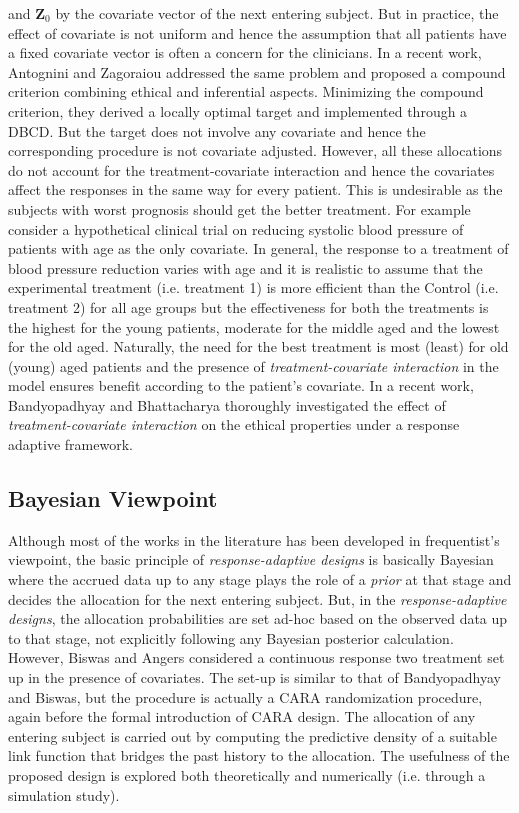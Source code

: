 and ${\mathbf{Z}}_{0}$ by the covariate vector of the next entering subject. But in practice, the effect of covariate is not uniform and hence  the assumption that all patients have a fixed covariate vector is often a concern for the clinicians. In a recent work, Antognini and Zagoraiou\cite{65} addressed the same problem and proposed a compound criterion combining ethical and inferential aspects. Minimizing the compound criterion, they derived a locally optimal target and implemented through a DBCD. But the target does not involve any covariate  and hence the corresponding procedure is not covariate adjusted.  However, all these allocations do not account for the treatment-covariate interaction\cite{66} and hence the covariates affect the responses in the same way for every patient. This is undesirable as the subjects with worst prognosis should get the better treatment. For example consider a hypothetical clinical trial on reducing systolic blood pressure of patients with age  as the only covariate. In general,  the response to a treatment of blood pressure reduction varies with age and it is realistic to assume that the experimental treatment (i.e. treatment 1) is more efficient than the Control (i.e. treatment 2) for all age groups but the effectiveness for both the treatments is the highest for the young patients, moderate for the middle aged and the lowest for the old aged. Naturally, the need for the best treatment is most (least) for  old (young) aged patients and the presence of \textit{treatment-covariate interaction} in the model ensures  benefit according to the patient's covariate. In a recent work, Bandyopadhyay and Bhattacharya\cite{67} thoroughly investigated the effect of \textit{treatment-covariate interaction} on the ethical properties under a response adaptive framework.

\subsection{Bayesian Viewpoint}

Although most of the works in the literature has been developed in frequentist's viewpoint, the basic principle of \textit{response-adaptive designs} is basically Bayesian where the accrued data up to any stage plays the
role of a \textit{prior} at that stage and decides the allocation for the next
entering subject. But, in the \textit{response-adaptive designs}, the allocation probabilities are set ad-hoc based on the observed data up to that stage, not explicitly following any Bayesian posterior calculation. However, Biswas and Angers\cite{68} considered a continuous response two treatment set up in the presence of covariates. The set-up is similar to that of Bandyopadhyay and Biswas\cite{60}, but the procedure is actually a CARA randomization procedure, again before the formal introduction of CARA design\cite{14}.
The allocation of any entering subject is carried out by computing
the predictive density of a suitable link function that bridges the
past history to the allocation. The usefulness of the proposed design is explored both theoretically and numerically (i.e. through a simulation study).

